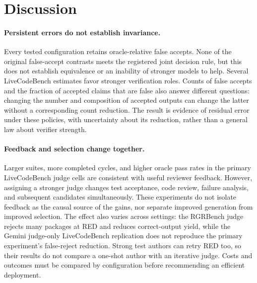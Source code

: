 \documentclass{article}
\begin{document}
\section{Discussion}
\label{sec:discussion}

\paragraph{Persistent errors do not establish invariance.} Every tested configuration retains
oracle-relative false accepts. None of the original false-accept contrasts meets the registered
joint decision rule, but this does not establish equivalence or an inability of stronger models
to help. Several LiveCodeBench estimates favor stronger verification roles. Counts of false
accepts and the fraction of accepted claims that are false also answer different questions:
changing the number and composition of accepted outputs can change the latter without a
corresponding count reduction. The result is evidence of residual error under these policies,
with uncertainty about its reduction, rather than a general law about verifier strength.

\paragraph{Feedback and selection change together.} Larger suites, more completed cycles, and
higher oracle pass rates in the primary LiveCodeBench judge cells are consistent with useful
reviewer feedback. However, assigning a stronger judge changes test acceptance, code review,
failure analysis, and subsequent candidates simultaneously. These experiments do not isolate
feedback as the causal source of the gains, nor separate improved generation from improved
selection. The effect also varies across settings: the RGRBench judge rejects many packages at
RED and reduces correct-output yield, while the Gemini judge-only LiveCodeBench replication does
not reproduce the primary experiment's false-reject reduction. Strong test authors can retry
RED too, so their results do not compare a one-shot author with an iterative judge. Costs and
outcomes must be compared by configuration before recommending an efficient deployment.
\end{document}
